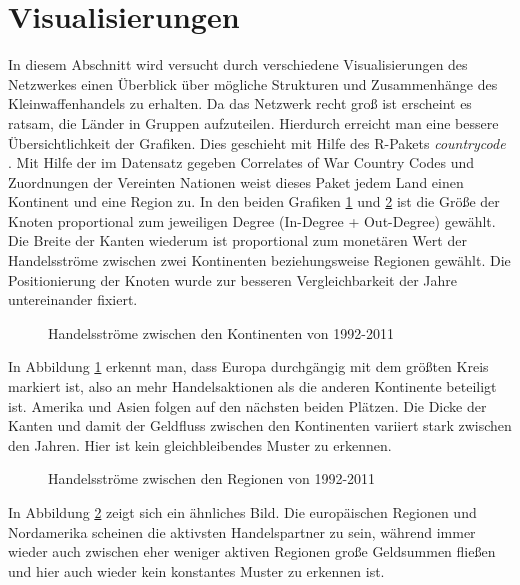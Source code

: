 \documentclass[a4paper,ngerman,oneside,titlepage,bibliography=totoc,11pt]{scrreprt}
\begin{document}
\newpage
\section{Visualisierungen}

In diesem Abschnitt wird versucht durch verschiedene Visualisierungen des Netzwerkes einen Überblick über mögliche Strukturen und Zusammenhänge des Kleinwaffenhandels zu erhalten. Da das Netzwerk recht groß ist erscheint es ratsam, die Länder in Gruppen aufzuteilen. Hierdurch erreicht man eine bessere Übersichtlichkeit der Grafiken. Dies geschieht mit Hilfe des R-Pakets \emph{countrycode} \cite{countrycode}. Mit Hilfe der im Datensatz gegeben Correlates of War Country Codes und Zuordnungen der Vereinten Nationen weist dieses Paket jedem Land einen Kontinent und eine Region zu. In den beiden Grafiken \ref{fig:cont} und \ref{fig:reg} ist die Größe der Knoten proportional zum jeweiligen Degree (In-Degree + Out-Degree) gewählt. Die Breite der Kanten wiederum ist proportional zum monetären Wert der Handelsströme zwischen zwei Kontinenten beziehungsweise Regionen gewählt. Die Positionierung der Knoten wurde zur besseren Vergleichbarkeit der Jahre untereinander fixiert.

\begin{figure}[!h]
\centering
{}
\caption{Handelsströme zwischen den Kontinenten von 1992-2011}
\label{fig:cont}
\end{figure}

In Abbildung \ref{fig:cont} erkennt man, dass Europa durchgängig mit dem größten Kreis markiert ist, also an mehr Handelsaktionen als die anderen Kontinente beteiligt ist. Amerika und Asien folgen auf den nächsten beiden Plätzen. Die Dicke der Kanten und damit der Geldfluss zwischen den Kontinenten variiert stark zwischen den Jahren. Hier ist kein gleichbleibendes Muster zu erkennen.

\begin{figure}[!h]
\centering
{}
\caption{Handelsströme zwischen den Regionen von 1992-2011}
\label{fig:reg}
\end{figure}

In Abbildung \ref{fig:reg} zeigt sich ein ähnliches Bild. Die europäischen Regionen und Nordamerika scheinen die aktivsten Handelspartner zu sein, während immer wieder auch zwischen eher weniger aktiven Regionen große Geldsummen fließen und hier auch wieder kein konstantes Muster zu erkennen ist.  
\end{document}
